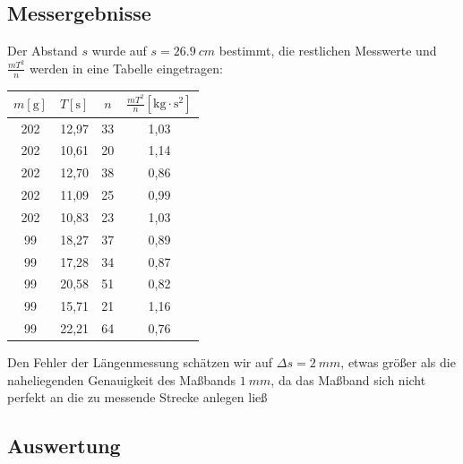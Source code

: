 \documentclass{article}
\begin{document}
	\subsection{Messergebnisse}
	Der Abstand \(s\) wurde auf \(s = \SI{26,9}{cm} \) bestimmt, die restlichen Messwerte und \( \frac{mT^2}{n} \) werden in eine Tabelle eingetragen:
	\begin{center}\label{tab:MesswertePräzession}
		\begin{tabular}{ |c|c|c|c| }
			\hline
			\(m[\unit{\gram}]\) & \(T[\unit{\second}]\) & \(n\) & \( \frac{mT^2}{n}[\unit{\kilogram \cdot \second^2}] \) \\
			\hline
			202                 & 12,97                 & 33    & 1,03 \\
			202                 & 10,61                 & 20    & 1,14 \\
			202                 & 12,70                 & 38    & 0,86 \\
			202                 & 11,09                 & 25    & 0,99 \\
			202                 & 10,83                 & 23    & 1,03 \\
			99                  & 18,27                 & 37    & 0,89 \\
			99                  & 17,28                 & 34    & 0,87 \\
			99                  & 20,58                 & 51    & 0,82 \\
			99                  & 15,71                 & 21    & 1,16 \\
			99                  & 22,21                 & 64    & 0,76 \\
			\hline
		\end{tabular}
	\end{center}
	Den Fehler der Längenmessung schätzen wir auf \( \Delta s = \SI{2}{mm} \), etwas größer als die naheliegenden Genauigkeit des Maßbands \(\SI{1}{mm}\),
	da das Maßband sich nicht perfekt an die zu messende Strecke anlegen ließ

	\subsection{Auswertung}
\end{document}
